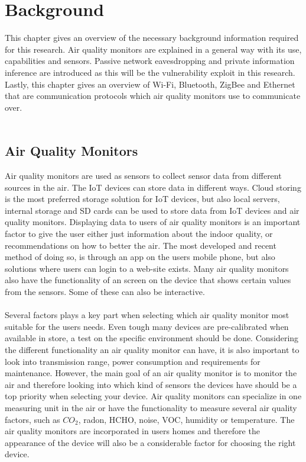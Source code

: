 \chapter{Background}
This chapter gives an overview of the necessary background information required for this research. Air quality monitors are explained in a general way with its use, capabilities and sensors. Passive network eavesdropping and private information inference are introduced as this will be the vulnerability exploit in this research. Lastly, this chapter gives an overview of Wi-Fi, Bluetooth, ZigBee and Ethernet that are communication protocols which air quality monitors use to communicate over. \\\\
\section{Air Quality Monitors}
Air quality monitors are used as sensors to collect sensor data from different sources in the air. \cite{GeneralAirQualityMonitor} The IoT devices can store data in different ways. Cloud storing is the most preferred storage solution for IoT devices, but also local servers, internal storage and SD cards can be used to store data from IoT devices and air quality monitors. \cite{AQMBigSource} Displaying data to users of air quality monitors is an important factor to give the user either just information about the indoor quality, or recommendations on how to better the air. \cite{AQMBigSource} The most developed and recent method of doing so, is through an app on the users mobile phone, but also solutions where users can login to a web-site exists. Many air quality monitors also have the functionality of an screen on the device that shows certain values from the sensors. Some of these can also be interactive. \cite{AQMBigSource}
\\\\
Several factors plays a key part when selecting which air quality monitor most suitable for the users needs. Even tough many devices are pre-calibrated when available in store, a test on the specific environment should be done. Considering the different functionality an air quality monitor can have, it is also important to look into transmission range, power consumption and requirements for maintenance. \cite{AQMBigSource} However, the main goal of an air quality monitor is to monitor the air and therefore looking into which kind of sensors the devices have should be a top priority when selecting your device. Air quality monitors can specialize in one measuring unit in the air or have the functionality to measure several air quality factors, such as \(CO_2\), radon, HCHO, noise, VOC, humidity or temperature. The air quality monitors are incorporated in users homes and therefore the appearance of the device will also be a considerable factor for choosing the right device. \cite{IAQMonitorCommunicationReview} 
